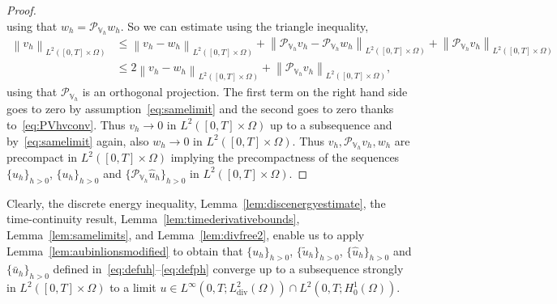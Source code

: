 \documentclass[10pt,letterpaper]{amsart}
\newcommand{\hu}{\widehat{u}}
\newcommand\norm[1]{\left\lVert#1\right\rVert}
\newcommand{\Div}{\operatorname{div}}
\newcommand{\dom}{\Omega}
\newcommand{\Vh}{\mathbb{V}_h}
\newcommand{\PVh}{\mathcal{P}_{\Vh}}
\theoremstyle{definition}{\newtheorem{definition}[lemma]{Definition}}
\numberwithin{equation}{section}
\begin{document}
\begin{proof}
\begin{equation*}
	\end{equation*}
	using that $w_h = \PVh w_h$. So we can estimate using the triangle inequality,
	\begin{align*}
		\norm{v_h}_{L^2([0,T]\times\dom)}&\leq \norm{v_h-w_h}_{L^2([0,T]\times\dom)} + \norm{\PVh v_h-\PVh w_h}_{L^2([0,T]\times\dom)} + \norm{\PVh v_h}_{L^2([0,T]\times\dom)}\\
		&\leq 2\norm{v_h-w_h}_{L^2([0,T]\times\dom)}   + \norm{\PVh v_h}_{L^2([0,T]\times\dom)},
	\end{align*}
	using that $\PVh$ is an orthogonal projection. The first term on the right hand side goes to zero by assumption~\eqref{eq:samelimit} and the second goes to zero thanks to~\eqref{eq:PVhvconv}. Thus $v_h\to 0$ in $L^2([0,T]\times\dom)$ up to a subsequence and by~\eqref{eq:samelimit} again, also $w_h\to 0$ in $L^2([0,T]\times\dom)$.
	Thus $v_h, \PVh v_h,w_h$ are precompact in $L^2([0,T]\times\dom)$ implying the precompactness of the sequences $\{\hu_h\}_{h>0}$, $\{u_h\}_{h>0}$ and $\{\PVh \hu_h\}_{h>0}$ in $L^2([0,T]\times\dom)$.
\end{proof}

Clearly, the discrete energy inequality, Lemma~\ref{lem:discenergyestimate}, the time-continuity result, Lemma~\ref{lem:timederivativebounds}, Lemma~\ref{lem:samelimits}, and Lemma~\ref{lem:divfree2}, enable us to apply Lemma~\ref{lem:aubinlionsmodified} to obtain that $\{u_h\}_{h>0}$, $\{\widetilde{u}_h\}_{h>0}$, $\{\widehat{u}_h\}_{h>0}$  and $\{\bar{u}_h\}_{h>0}$ defined in~\eqref{eq:defuh}--\eqref{eq:defph} converge up to a subsequence strongly in $L^2([0,T]\times\dom)$ to a limit $u\in L^\infty(0,T;L^2_{\Div}(\dom))\cap L^2(0,T;H^1_0(\dom))$.  
\end{document}
